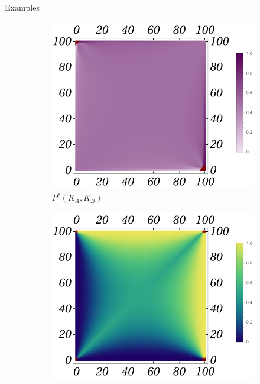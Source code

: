 \documentclass{beamer}
\theoremstyle{definition}
\begin{document}
\begin{frame}[shrink=20]{Examples}
    \begin{figure}[H]
    \centering
    \begin{subfigure}[b]{0.3\textwidth}
        \includegraphics[width=\textwidth]{img/PB_Plot_4_100.pdf}
        \caption{\small \centering $P^*(K_A,K_B)$}
        \label{fig:BGame4__100_P}
    \end{subfigure}
    \hfill %
    \begin{subfigure}[b]{0.3\textwidth}
        \includegraphics[width=\textwidth]{img/ppkB_Plot_4_100.pdf}

\end{subfigure}
\end{figure}
\end{frame}
\end{document}
